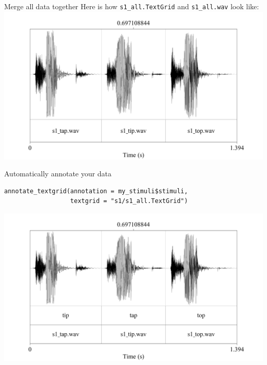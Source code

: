 \documentclass[13pt, t]{beamer}
\begin{document}
\begin{frame}[fragile]{Merge all data together}
Here is how \texttt{s1\_all.TextGrid} and \texttt{s1\_all.wav} look like:
\includegraphics[width=\linewidth]{images/03_concatenate.png}
\end{frame}

\begin{frame}[fragile]{Automatically annotate your data}
\begin{verbatim}
annotate_textgrid(annotation = my_stimuli$stimuli,
                  textgrid = "s1/s1_all.TextGrid")
\end{verbatim}
\includegraphics[width=\linewidth]{images/04_annotate.png}
\end{frame}
\end{document}
